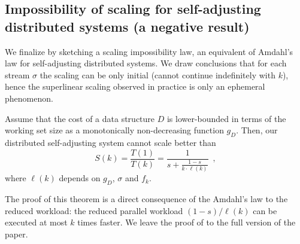 













\subsection{Impossibility of scaling for self-adjusting distributed systems (a negative result)}


We finalize by sketching a scaling impossibility law, an equivalent of Amdahl's law for self-adjusting distributed systems. We draw conclusions that for each stream $\sigma$ the scaling can be only initial (cannot continue indefinitely with $k$), hence the superlinear scaling observed in practice is only an ephemeral phenomenon.


\begin{theorem}
	\label{thm:upper}
Assume that the cost of a data structure $D$ is lower-bounded in terms of the working set size as a monotonically non-decreasing function $g_D$. 
Then, our distributed self-adjusting system cannot scale better than
 \begin{displaymath}
    S(k) = \frac{T(1)}{T(k)} = \frac{1}{s + \frac{1-s}{k \cdot \ell(k)}} \enspace ,
  \end{displaymath}
  where $\ell(k)$ depends on $g_D$, $\sigma$ and $f_k$.
\end{theorem}

The proof of this theorem is a direct consequence of the Amdahl's law to the reduced workload: the reduced parallel workload $(1-s)/\ell(k)$ can be executed at most $k$ times faster.
We leave the proof of to the full version of the paper.
 

